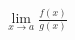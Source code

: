 \documentclass[preview]{standalone}
\begin{document}
\begin{align*}
{\lim_{x \to a} \frac{f(x)}{g(x)}}
\end{align*}
\end{document}

